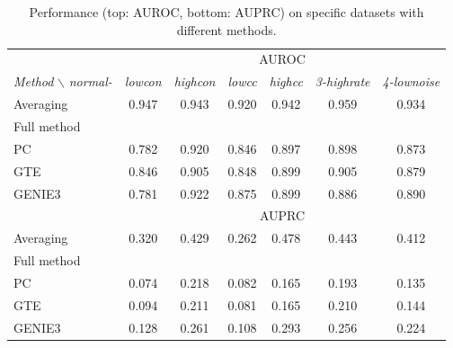 \documentclass[wcp]{jmlr}
\begin{document}
\begin{table}[h]
\centering
\small
\begin{tabular}{| l | c c c c c c |}
\hline
& \multicolumn{6}{c|}{AUROC}\\
\textit{Method} $\backslash$ \textit{normal-} & \textit{lowcon} & \textit{highcon} & \textit{lowcc} & \textit{highcc} & \textit{3-highrate} & \textit{4-lownoise} \\
\hline
\hline
Averaging     & 0.947 & 0.943 & 0.920 & 0.942 & 0.959 & 0.934 \\
Full method   &  &  &  & & &\\
PC & 0.782 & 0.920 &  0.846 & 0.897  & 0.898  & 0.873 \\
GTE & 0.846 & 0.905 & 0.848 & 0.899 & 0.905 & 0.879\\
GENIE3 & 0.781 &  0.922 & 0.875 & 0.899 & 0.886 &  0.890 \\ \hline
& \multicolumn{6}{c|}{AUPRC}\\ \hline
Averaging     & 0.320 & 0.429 & 0.262 & 0.478 & 0.443 & 0.412 \\
Full method   &  &  &  & & &\\
PC & 0.074 & 0.218 & 0.082 & 0.165  & 0.193 & 0.135 \\
GTE & 0.094 & 0.211 & 0.081 & 0.165 & 0.210 & 0.144\\
GENIE3 & 0.128 & 0.261 & 0.108 & 0.293 & 0.256 & 0.224\\ \hline
\end{tabular}
\caption{Performance (top: AUROC, bottom: AUPRC) on specific datasets with different methods.}
\label{tab:results_appendix}
\end{table}
\end{document}

